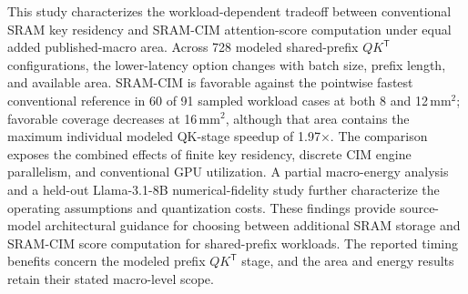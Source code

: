 This study characterizes the workload-dependent tradeoff between conventional SRAM key residency and SRAM-CIM attention-score computation under equal added published-macro area. Across 728 modeled shared-prefix $QK^{\mathsf T}$ configurations, the lower-latency option changes with batch size, prefix length, and available area. SRAM-CIM is favorable against the pointwise fastest conventional reference in 60 of 91 sampled workload cases at both 8 and 12\,mm$^2$; favorable coverage decreases at 16\,mm$^2$, although that area contains the maximum individual modeled QK-stage speedup of 1.97$\times$. The comparison exposes the combined effects of finite key residency, discrete CIM engine parallelism, and conventional GPU utilization. A partial macro-energy analysis and a held-out Llama-3.1-8B numerical-fidelity study further characterize the operating assumptions and quantization costs. These findings provide source-model architectural guidance for choosing between additional SRAM storage and SRAM-CIM score computation for shared-prefix workloads. The reported timing benefits concern the modeled prefix $QK^{\mathsf T}$ stage, and the area and energy results retain their stated macro-level scope.

